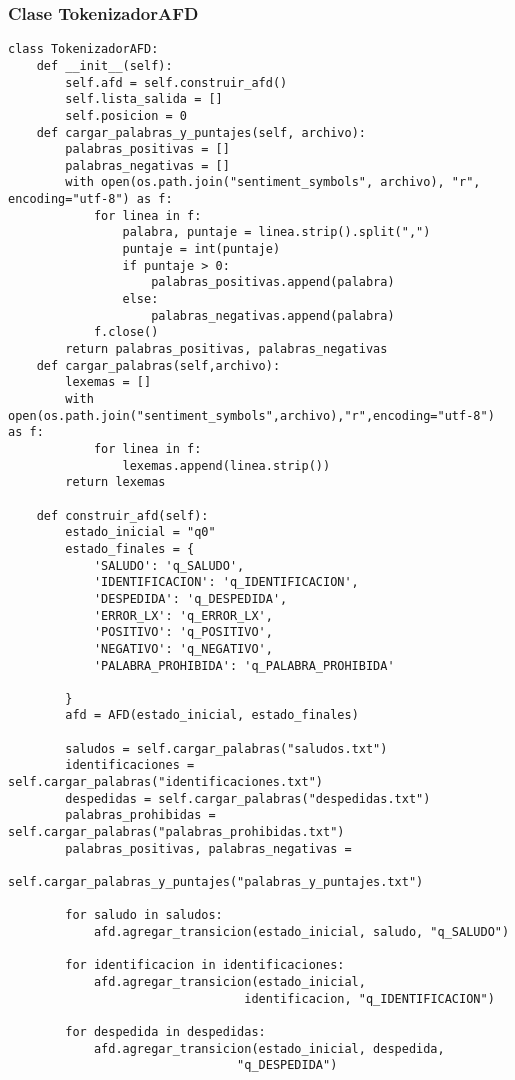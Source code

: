 \documentclass[12pt,a4paper]{scrartcl} %
\begin{document}
\subsubsection{Clase TokenizadorAFD}
\begin{verbatim}
class TokenizadorAFD:
    def __init__(self):
        self.afd = self.construir_afd()
        self.lista_salida = []
        self.posicion = 0
    def cargar_palabras_y_puntajes(self, archivo):
        palabras_positivas = []
        palabras_negativas = []
        with open(os.path.join("sentiment_symbols", archivo), "r", encoding="utf-8") as f:
            for linea in f:
                palabra, puntaje = linea.strip().split(",")
                puntaje = int(puntaje)
                if puntaje > 0:
                    palabras_positivas.append(palabra)
                else:
                    palabras_negativas.append(palabra)
            f.close()
        return palabras_positivas, palabras_negativas
    def cargar_palabras(self,archivo):
        lexemas = []
        with open(os.path.join("sentiment_symbols",archivo),"r",encoding="utf-8") as f:
            for linea in f:
                lexemas.append(linea.strip())
        return lexemas

    def construir_afd(self):
        estado_inicial = "q0"
        estado_finales = {
            'SALUDO': 'q_SALUDO',
            'IDENTIFICACION': 'q_IDENTIFICACION',
            'DESPEDIDA': 'q_DESPEDIDA',
            'ERROR_LX': 'q_ERROR_LX',
            'POSITIVO': 'q_POSITIVO',
            'NEGATIVO': 'q_NEGATIVO',
            'PALABRA_PROHIBIDA': 'q_PALABRA_PROHIBIDA' 

        }     
        afd = AFD(estado_inicial, estado_finales)
        
        saludos = self.cargar_palabras("saludos.txt")
        identificaciones = self.cargar_palabras("identificaciones.txt")
        despedidas = self.cargar_palabras("despedidas.txt")
        palabras_prohibidas = self.cargar_palabras("palabras_prohibidas.txt")
        palabras_positivas, palabras_negativas = 
                    self.cargar_palabras_y_puntajes("palabras_y_puntajes.txt")

        for saludo in saludos:
            afd.agregar_transicion(estado_inicial, saludo, "q_SALUDO")

        for identificacion in identificaciones:
            afd.agregar_transicion(estado_inicial,
                                 identificacion, "q_IDENTIFICACION")

        for despedida in despedidas:
            afd.agregar_transicion(estado_inicial, despedida, 
                                "q_DESPEDIDA")


\end{verbatim}
\end{document}
